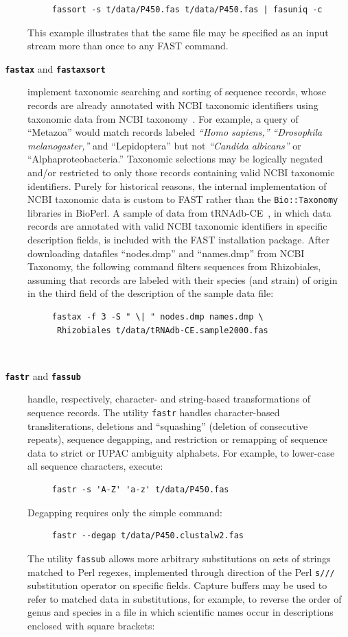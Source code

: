 \documentclass{frontiersSCNS} %
\begin{document}
\begin{description}
\begin{verbatim}
     fassort -s t/data/P450.fas t/data/P450.fas | fasuniq -c
\end{verbatim}
  \noindent This example illustrates that the same file may be
  specified as an input stream more than once to any FAST command.
\\
\item[\texttt{\textbf{ fastax}} and \texttt{\textbf{fastaxsort}} ]
  implement taxonomic searching and sorting of sequence records, whose
  records are already annotated with NCBI taxonomic identifiers using
  taxonomic data from NCBI taxonomy~\citep{Benson2009,
    Sayers2009}. For example, a query of ``Metazoa'' would match
  records labeled {\it ``Homo sapiens,''} {\it ``Drosophila
    melanogaster,''} and ``Lepidoptera'' but not {\it ``Candida
    albicans''} or ``Alphaproteobacteria.''  Taxonomic
  selections may be logically negated and/or restricted to only those
  records containing valid NCBI taxonomic identifiers. Purely for
  historical reasons, the internal implementation of NCBI taxonomic
  data is custom to FAST rather than the {\tt Bio::Taxonomy} libraries
  in BioPerl. A sample of data from
  tRNAdb-CE~\citep{10.3389/fgene.2014.00114}, in which data records
  are annotated with valid NCBI taxonomic identifiers in specific
  description fields, is included with the FAST installation package.
  After downloading datafiles ``nodes.dmp'' and ``names.dmp'' from
  NCBI Taxonomy, the following command filters sequences from
  Rhizobiales, assuming that records are labeled with their species
  (and strain) of origin in the third field of the description of the
  sample data file:
\begin{verbatim}
     fastax -f 3 -S " \| " nodes.dmp names.dmp \ 
      Rhizobiales t/data/tRNAdb-CE.sample2000.fas
\end{verbatim}
\\
\item[\texttt{\textbf{ fastr}} and \texttt{\textbf{fassub}} ] handle,
  respectively, character- and string-based transformations of
  sequence records. The utility {\tt fastr} handles character-based
  transliterations, deletions and ``squashing'' (deletion of
  consecutive repeats), sequence degapping, and restriction or
  remapping of sequence data to strict or IUPAC ambiguity
  alphabets. For example, to lower-case all sequence characters,
  execute:
\begin{verbatim}
     fastr -s 'A-Z' 'a-z' t/data/P450.fas
\end{verbatim}
\noindent Degapping requires only the simple command:
 \begin{verbatim}
     fastr --degap t/data/P450.clustalw2.fas
\end{verbatim}
\noindent The utility {\tt fassub} allows more arbitrary substitutions on sets of strings
matched to Perl regexes, implemented through direction of the Perl {\tt s///} substitution
operator on specific fields. Capture buffers may be used to refer to matched data in
substitutions, for example, to reverse the order of genus and species
in a file in which scientific names occur in descriptions enclosed
with square brackets:


\end{description}
\end{document}
